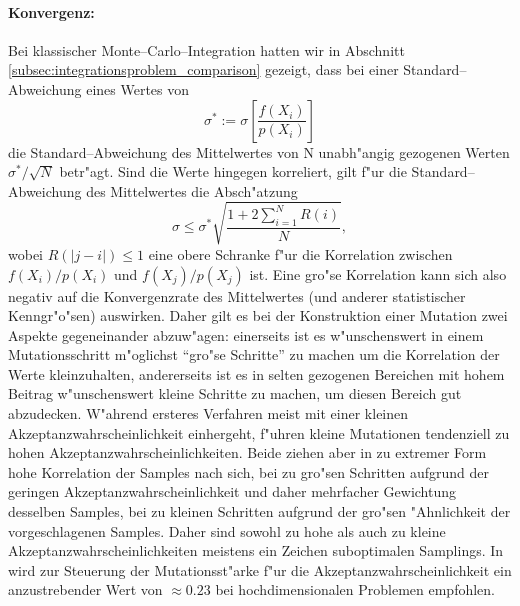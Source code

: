	\paragraph{Konvergenz:}Bei klassischer Monte--Carlo--Integration hatten wir in Abschnitt \ref{subsec:integrationsproblem_comparison} gezeigt, dass bei einer Standard--Abweichung eines Wertes von $$\sigma^*:=\sigma\left[\frac{f(X_i)}{p(X_i)}\right]$$ die Standard--Abweichung des Mittelwertes von N unabh"angig gezogenen Werten $\sigma^*/\sqrt{N}$ betr"agt. Sind die Werte hingegen korreliert, gilt f"ur die Standard--Abweichung des Mittelwertes die Absch"atzung \citep[siehe][VII.\;\S3(8)]{Renyi:1964p10655}
	$$\sigma\leq \sigma^*\sqrt{\frac{1+2\sum_{i=1}^N R(i)}{N}},$$
	wobei $R(|j-i|)\leq 1$ eine obere Schranke f"ur die Korrelation zwischen $f(X_i)/p(X_i)$ und $f(X_j)/p(X_j)$ ist.
	Eine gro"se Korrelation kann sich also negativ auf die Konvergenzrate des Mittelwertes (und anderer statistischer Kenngr"o"sen) auswirken. Daher gilt es bei der Konstruktion einer Mutation zwei Aspekte gegeneinander abzuw"agen: einerseits ist es w"unschenswert in einem Mutationsschritt m"oglichst ``gro"se Schritte'' zu machen um die Korrelation der Werte kleinzuhalten, andererseits ist es in selten gezogenen Bereichen mit hohem Beitrag w"unschenswert kleine Schritte zu machen, um diesen Bereich gut abzudecken. W"ahrend ersteres Verfahren meist mit einer kleinen Akzeptanzwahrscheinlichkeit einhergeht, f"uhren kleine Mutationen tendenziell zu hohen Akzeptanzwahrscheinlichkeiten. Beide ziehen aber in zu extremer Form hohe Korrelation der Samples nach sich, bei zu gro"sen Schritten aufgrund der geringen Akzeptanzwahrscheinlichkeit und daher mehrfacher Gewichtung desselben Samples, bei zu kleinen Schritten aufgrund der gro"sen "Ahnlichkeit der vorgeschlagenen Samples. Daher sind sowohl zu hohe als auch zu kleine Akzeptanzwahrscheinlichkeiten meistens ein Zeichen suboptimalen Samplings. In \citep{Roberts:1997p5198} wird zur Steuerung der Mutationsst"arke f"ur die Akzeptanzwahrscheinlichkeit ein anzustrebender Wert von $\approx 0.23$ bei hochdimensionalen Problemen empfohlen.

	
	
